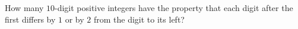 How many $10$-digit positive integers have the property that each digit after the first differs by $1$ or by $2$ from the digit to its left?
